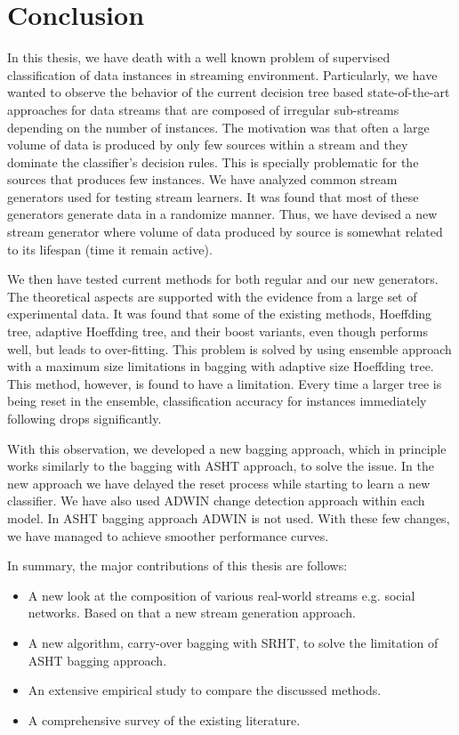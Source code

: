 \chapter{Conclusion}
\label{chp:conclude}

In this thesis, we have death with a well known problem of supervised classification of data instances in streaming environment. Particularly, we have wanted to observe the behavior of the current decision tree based state-of-the-art approaches for data streams that are composed of irregular sub-streams depending on the number of instances. The motivation was that often a large volume of data is produced by only few sources within a stream and they dominate the classifier's decision rules. This is specially problematic for the sources that produces few instances. We have analyzed common stream generators used for testing stream learners. It was found that most of these generators generate data in a randomize manner. Thus, we have devised a new stream generator where volume of data produced by source is somewhat related to its lifespan (time it remain active). 

We then have tested current methods for both regular and our new generators. The theoretical aspects are supported with the evidence from a large set of experimental data. It was found that some of the existing methods, Hoeffding tree, adaptive Hoeffding tree, and their boost variants, even though performs well, but leads to over-fitting. This problem is solved by using ensemble approach with a maximum size limitations in bagging with adaptive size Hoeffding tree. This method, however, is found to have a limitation. Every time a larger tree is being reset in the ensemble, classification accuracy for instances immediately following drops significantly. 

With this observation, we developed a new bagging approach, which in principle works similarly to the bagging with ASHT approach, to solve the issue. In the new approach we have delayed the reset process while starting to learn a new classifier. We have also used ADWIN change detection approach within each model. In ASHT bagging approach ADWIN is not used. With these few changes, we have managed to achieve smoother performance curves.

In summary, the major contributions of this thesis are follows:

\begin{itemize}
    \item A new look at the composition of various real-world streams e.g. social networks. Based on that a new stream generation approach.
    
    \item A new algorithm, carry-over bagging with SRHT, to solve the limitation of ASHT bagging approach.
    
    \item An extensive empirical study to compare the discussed methods.
    
    \item A comprehensive survey of the existing literature.
\end{itemize}

